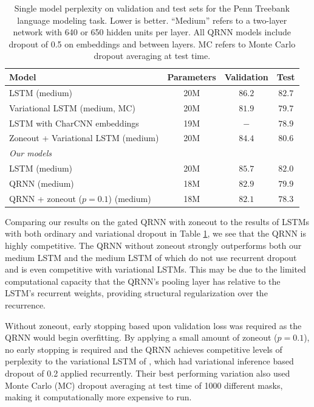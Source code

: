 \documentclass{article} %
\begin{document}
\begin{table}[b]
\centering
\small
\begin{tabular}{l|ccc}
\toprule
\bf Model & \bf Parameters & \bf Validation &  \bf Test \\
\midrule
LSTM (medium) \citep{Zaremba2014} & 20M & $86.2$ & $82.7$ \\
Variational LSTM (medium, MC) \citep{Gal2015} & 20M & $81.9$ & $79.7$ \\
LSTM with CharCNN embeddings \citep{Kim2016} & 19M & $-$ & $78.9$ \\
Zoneout + Variational LSTM (medium) \citep{Merity2016} & 20M & $84.4$ & $80.6$ \\
\midrule
{\it Our models}\\
LSTM (medium) & 20M & $85.7$ & $82.0$ \\
QRNN (medium) & 18M & $82.9$ & $79.9$ \\
QRNN + zoneout ($p=0.1$) (medium) & 18M & $82.1$ & $78.3$ \\
\bottomrule
\end{tabular}
\caption{
Single model perplexity on validation and test sets for the Penn Treebank language modeling task. Lower is better.
``Medium'' refers to a two-layer network with 640 or 650 hidden units per layer. All QRNN models include dropout of 0.5 on embeddings and between layers.
MC refers to Monte Carlo dropout averaging at test time.
}
\label{table:PTBresults}
\end{table}

Comparing our results on the gated QRNN with zoneout to the results of LSTMs with both ordinary and variational dropout in Table \ref{table:PTBresults}, we see that the QRNN is highly competitive.
The QRNN without zoneout strongly outperforms both our medium LSTM and the medium LSTM of \citet{Zaremba2014} which do not use recurrent dropout
and is even competitive with variational LSTMs.
This may be due to the limited computational capacity that the QRNN's pooling layer has relative to the LSTM's recurrent weights,
providing structural regularization over the recurrence.

Without zoneout, early stopping based upon validation loss was required as the QRNN would begin overfitting.
By applying a small amount of zoneout ($p=0.1$), no early stopping is required and the QRNN achieves competitive levels of perplexity to the variational LSTM of \citet{Gal2015}, which had variational inference based dropout of 0.2 applied recurrently.
Their best performing variation also used Monte Carlo (MC) dropout averaging at test time of 1000 different masks, making it computationally more expensive to run.
\end{document}
